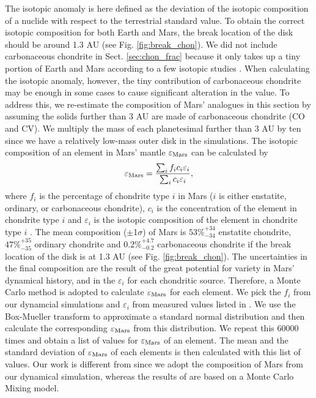 \documentclass{aa}
\begin{document}
The isotopic anomaly is here defined as the deviation of the isotopic composition of a nuclide with respect to the terrestrial standard value. To obtain the correct isotopic composition for both Earth and Mars, the break location of the disk should be around 1.3 AU (see Fig. \ref{fig:break_chon}). We did not include carbonaceous chondrite in Sect. \ref{sec:chon_frac} because it only takes up a tiny portion of Earth and Mars according to a few isotopic studies \citep{warren2011stable,dauphas2017isotopic,dauphas2014calcium,sanloup1999simple}. When calculating the isotopic anomaly, however, the tiny contribution of carbonaceous chondrite may be enough in some cases to cause significant alteration in the value. To address this, we re-estimate the composition of Mars' analogues in this section by assuming the solids further than 3 AU are made of carbonaceous chondrite (CO and CV). We multiply the mass of each planetesimal further than 3 AU by ten since we have a relatively low-mass outer disk in the simulations. The isotopic composition of an element in Mars’ mantle $\varepsilon_{\rm Mars}$ can be calculated by
\begin{equation}
\varepsilon_{\rm Mars} = {\sum_i f_i c_i \varepsilon_i \over \sum_i c_i \varepsilon_i},
\label{eq:epsilon}  
\end{equation} 
where $f_i$ is the percentage of chondrite type $i$ in Mars ($i$ is either enstatite, ordinary, or carbonaceous chondrite), $c_i$ is the concentration of the element in chondrite type $i$ and $\varepsilon_i$ is the isotopic composition of the element in chondrite type $i$ \citep{dauphas2017isotopic}. The mean composition ($\pm$1$\sigma$) of Mars is $53\%^{+34}_{-34}$ enstatite chondrite, $47\%^{+35}_{-35}$ ordinary chondrite and $0.2\%^{+4.7}_{-0.2}$ carbonaceous chondrite if the break location of the disk is at 1.3 AU (see Fig. \ref{fig:break_chon}). The uncertainties in the final composition are the result of the great potential for variety in Mars' dynamical history, and in the $\varepsilon_i$ for each chondritic source. Therefore, a Monte Carlo method is adopted to calculate $\varepsilon_{\rm Mars}$ for each element. We pick the $f_i$ from our dynamcial simulations and $\varepsilon_i$ from measured values listed in \cite{dauphas2017isotopic}. We use the Box-Mueller transform to approximate a standard normal distribution and then calculate the corresponding $\varepsilon_{\rm Mars}$ from this distribution. We repeat this 60000 times and obtain a list of values for $\varepsilon_{\rm Mars}$ of an element. The mean and the standard deviation of $\varepsilon_{\rm Mars}$ of each elements is then calculated with this list of values. Our work is different from \cite{brasser2018GRL} since we adopt the composition of Mars from our dynamical simulation, whereas the results of \cite{brasser2018GRL} are based on a Monte Carlo Mixing model. 
\end{document}
